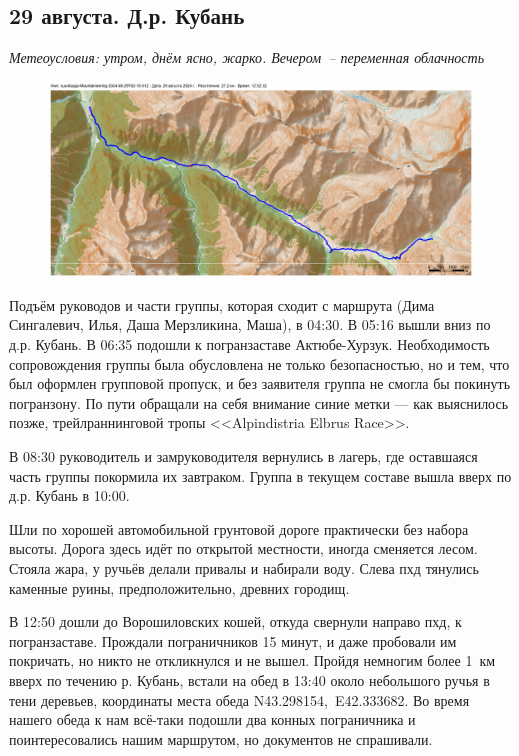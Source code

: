 \subsection{29 августа. Д.р. Кубань}
\textit{Метеоусловия: утром, днём ясно, жарко. Вечером~-- переменная облачность}

\begin{figure}[h!]
	\centering
	\includegraphics[angle=0, width=0.7\linewidth]{../pics/mini_maps/29}
	\label{fig:mini_29}
\end{figure}


Подъём руководов и части группы, которая сходит с маршрута (Дима Сингалевич, Илья, Даша Мерзликина, Маша), в 04:30. В 05:16 вышли вниз по д.р. Кубань. В 06:35 подошли к погранзаставе Актюбе-Хурзук. Необходимость сопровождения группы была обусловлена не только безопасностью, но и тем, что был оформлен групповой пропуск, и без заявителя группа не смогла бы покинуть погранзону. По пути обращали на себя внимание синие метки --- как выяснилось позже, трейлраннинговой тропы <<Alpindistria Elbrus Race>>.

В 08:30 руководитель и замруководителя вернулись в лагерь, где оставшаяся часть группы покормила их завтраком. Группа в текущем составе вышла вверх по д.р. Кубань в 10:00.


Шли по хорошей автомобильной грунтовой дороге практически без набора высоты. Дорога здесь идёт по открытой местности, иногда сменяется лесом. Стояла жара, у ручьёв делали привалы и набирали воду. Слева пхд тянулись каменные руины, предположительно, древних городищ.


В 12:50 дошли до Ворошиловских кошей, откуда свернули направо пхд, к погранзаставе. Прождали пограничников 15 минут, и даже пробовали им покричать, но никто не откликнулся и не вышел. Пройдя немногим более 1~км вверх по течению р. Кубань, встали на обед в 13:40 около небольшого ручья в тени деревьев, координаты места обеда N43.298154\degree,~E42.333682\degree. Во время нашего обеда к нам всё-таки подошли два конных пограничника и поинтересовались нашим маршрутом, но документов не спрашивали.

